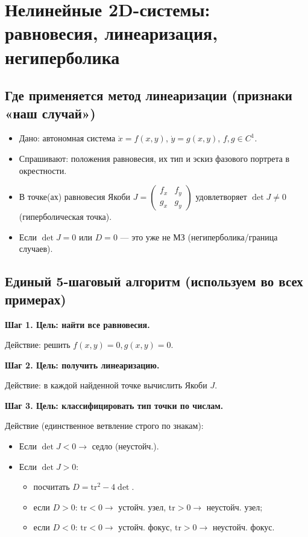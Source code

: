 \section{Нелинейные 2D-системы: равновесия, линеаризация, негиперболика}\label{sec:nonlinear-2d-systems}


\subsection{Где применяется метод линеаризации (признаки «наш случай»)}
\begin{itemize}
    \item Дано: автономная система $\dot{x} = f(x, y)$, $\dot{y} = g(x,y)$, $f, g \in C^1$.
    \item Спрашивают: положения равновесия, их тип и эскиз фазового портрета в окрестности.
    \item В точке(ах) равновесия Якоби $J = \begin{pmatrix} f_x & f_y \\ g_x & g_y \end{pmatrix}$ удовлетворяет $\det J \neq 0$ (гиперболическая точка).
    \item Если $\det J = 0$ или $D = 0$ --- это уже не МЗ (негиперболика/граница случаев).
\end{itemize}

\subsection{Единый 5-шаговый алгоритм (используем во всех примерах)}

\textbf{Шаг 1. Цель: найти все равновесия.}

Действие: решить $f(x, y) = 0, g(x, y) = 0$.

\textbf{Шаг 2. Цель: получить линеаризацию.}

Действие: в каждой найденной точке вычислить Якоби $J$.

\textbf{Шаг 3. Цель: классифицировать тип точки по числам.}

Действие (единственное ветвление строго по знакам):
\begin{itemize}
    \item Если $\det J < 0 \to$ седло (неустойч.).
    \item Если $\det J > 0$:
    \begin{itemize}
        \item посчитать $D = \text{tr}^2 - 4 \det$.
        \item если $D > 0$: $\text{tr} < 0 \to$ устойч. узел, $\text{tr} > 0 \to$ неустойч. узел;
        \item если $D < 0$: $\text{tr} < 0 \to$ устойч. фокус, $\text{tr} > 0 \to$ неустойч. фокус.
    \end{itemize}
\end{itemize}

